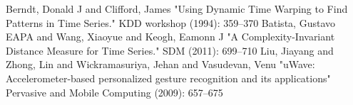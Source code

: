 \documentclass[runningheads,a4paper]{llncs}
\begin{document}


    \begin{thebibliography}{1}
         Berndt, Donald J and Clifford, James "Using Dynamic Time Warping to Find Patterns in
        Time Series." KDD workshop (1994): 359--370
         Batista, Gustavo EAPA and Wang, Xiaoyue and Keogh, Eamonn J "A
        Complexity-Invariant Distance Measure for Time Series." SDM (2011): 699--710
         Liu, Jiayang and Zhong, Lin and Wickramasuriya, Jehan and Vasudevan, Venu "uWave:
        Accelerometer-based personalized gesture recognition and its applications" Pervasive and Mobile Computing
        (2009): 657--675
    \end{thebibliography}
\end{document}
